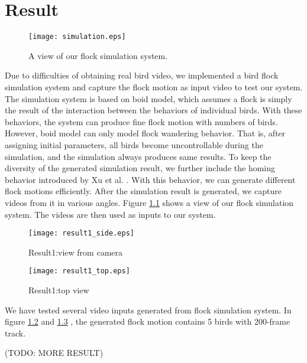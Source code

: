 \chapter{Result}


\begin{figure}[h]
 \begin{center}
  \texttt{[image: simulation.eps]}
 \end{center}
 \caption{A view of our flock simulation system.}
 \label{figure:simulation}
\end{figure}


Due to difficulties of obtaining real bird video, we implemented a bird flock simulation system and capture the flock motion as input video to test our system. The simulation system is based on boid model, which assumes a flock is simply the result of the interaction between the behaviors of individual birds. With these behaviors, the system can produce fine flock motion with numbers of birds. However, boid model can only model flock wandering behavior. That is, after assigning initial parameters, all birds become uncontrollable during the simulation, and the simulation always produces same results. To keep the diversity of the generated simulation result, we further include the homing behavior introduced by Xu et al. \cite{Shape}. With this behavior, we can generate different flock motions efficiently. After the simulation result is generated, we capture videos from it in various angles. Figure \ref{figure:simulation} shows a view of our flock simulation system. The videos are then used as inputs to our system.


\begin{figure}[h]
 \begin{center}
  \texttt{[image: result1\_side.eps]}
 \end{center}
 \caption{Result1:view from camera}
 \label{figure:result1_side}
\end{figure}

\begin{figure}[h]
 \begin{center}
  \texttt{[image: result1\_top.eps]}
 \end{center}
 \caption{Result1:top view}
 \label{figure:result1_top}
\end{figure}


We have tested several video inputs generated from flock simulation system. In figure \ref{figure:result1_side} and \ref{figure:result1_top} , the generated flock motion contains 5 birds with 200-frame track.


(TODO: MORE RESULT)
